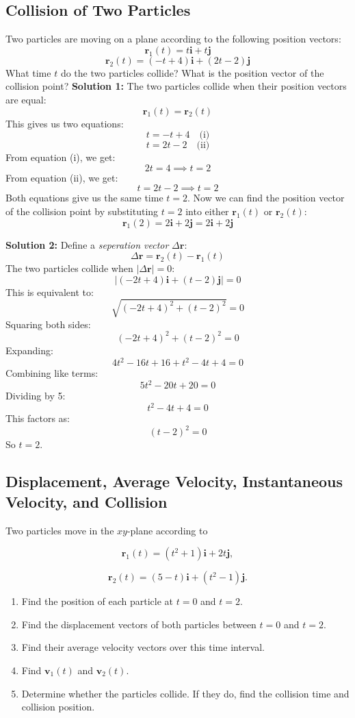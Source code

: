 \documentclass[../main.tex]{subfiles}
\theoremstyle{remark}
\begin{document}
\subsection{Collision of Two Particles}
Two particles are moving on a plane according to the following position vectors:
\[
\mathbf{r}_1(t) = t\mathbf{i} + t\mathbf{j}
\]
\[
\mathbf{r}_2(t) = (-t+4)\mathbf{i} + (2t-2)\mathbf{j}
\]
What time $t$ do the two particles collide? What is the position vector of the collision point?
\textbf{Solution 1:} The two particles collide when their position vectors are equal:
\[
\mathbf{r}_1(t) = \mathbf{r}_2(t)
\]
This gives us two equations:
\[
t = -t + 4 \quad \text{(i)}
\]
\[
t = 2t - 2 \quad \text{(ii)}
\]
From equation (i), we get:
\[
2t = 4 \implies t = 2
\]
From equation (ii), we get:
\[
t = 2t - 2 \implies t = 2
\]
Both equations give us the same time $t = 2$. Now we can find the position vector of the collision point by substituting $t = 2$ into either $\mathbf{r}_1(t)$ or $\mathbf{r}_2(t)$:
\[
\mathbf{r}_1(2) = 2\mathbf{i} + 2\mathbf{j} = 2\mathbf{i} + 2\mathbf{j} 
\]

\textbf{Solution 2:} Define a \emph{seperation vector} $\Delta\mathbf{r}$:
\[
\Delta\mathbf{r} = \mathbf{r}_2(t) - \mathbf{r}_1(t)
\]
The two particles collide when $|\Delta\mathbf{r}| = 0$:
\[
|(-2t+4)\mathbf{i} + (t-2)\mathbf{j}| = 0
\]
This is equivalent to:
\[
\sqrt{(-2t+4)^2 + (t-2)^2} = 0
\]
Squaring both sides:
\[
(-2t+4)^2 + (t-2)^2 = 0
\]
Expanding:
\[
4t^2 - 16t + 16 + t^2 - 4t + 4 = 0
\]
Combining like terms:
\[
5t^2 - 20t + 20 = 0
\]
Dividing by 5:
\[
t^2 - 4t + 4 = 0
\]
This factors as:
\[
(t-2)^2 = 0
\]
So $t = 2$.

\subsection{Displacement, Average Velocity, Instantaneous Velocity, and Collision}

Two particles move in the \(xy\)-plane according to

\[
\mathbf{r}_1(t)=(t^2+1)\mathbf{i}+2t\mathbf{j},
\]

\[
\mathbf{r}_2(t)=(5-t)\mathbf{i}+(t^2-1)\mathbf{j}.
\]

\begin{enumerate}
    \item Find the position of each particle at \(t=0\) and \(t=2\).
    \item Find the displacement vectors of both particles between \(t=0\) and \(t=2\).
    \item Find their average velocity vectors over this time interval.
    \item Find \(\mathbf{v}_1(t)\) and \(\mathbf{v}_2(t)\).
    \item Determine whether the particles collide. If they do, find the collision time and collision position.
\end{enumerate}
\end{document}
